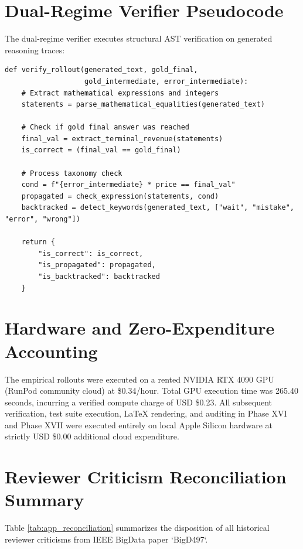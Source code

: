 \documentclass[11pt,letterpaper]{article}
\begin{document}
\section{Dual-Regime Verifier Pseudocode}
\label{app:verifier}
The dual-regime verifier executes structural AST verification on generated reasoning traces:
\begin{footnotesize}
\begin{verbatim}
def verify_rollout(generated_text, gold_final,
                   gold_intermediate, error_intermediate):
    # Extract mathematical expressions and integers
    statements = parse_mathematical_equalities(generated_text)
    
    # Check if gold final answer was reached
    final_val = extract_terminal_revenue(statements)
    is_correct = (final_val == gold_final)
    
    # Process taxonomy check
    cond = f"{error_intermediate} * price == final_val"
    propagated = check_expression(statements, cond)
    backtracked = detect_keywords(generated_text, ["wait", "mistake", "error", "wrong"])
    
    return {
        "is_correct": is_correct,
        "is_propagated": propagated,
        "is_backtracked": backtracked
    }
\end{verbatim}
\end{footnotesize}

\section{Hardware and Zero-Expenditure Accounting}
\label{app:compute}
The empirical rollouts were executed on a rented NVIDIA RTX 4090 GPU (RunPod community cloud) at \$0.34/hour. Total GPU execution time was 265.40 seconds, incurring a verified compute charge of USD \$0.23. All subsequent verification, test suite execution, LaTeX rendering, and auditing in Phase XVI and Phase XVII were executed entirely on local Apple Silicon hardware at strictly USD \$0.00 additional cloud expenditure.

\section{Reviewer Criticism Reconciliation Summary}
\label{app:reconciliation}
Table \ref{tab:app_reconciliation} summarizes the disposition of all historical reviewer criticisms from IEEE BigData paper `BigD497`.
\end{document}
